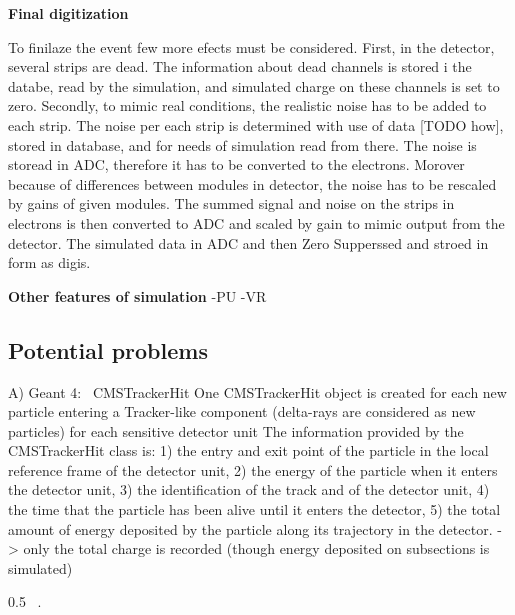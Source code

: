\textbf{Final digitization}

To finilaze the event few more efects must be considered. First, in the detector, several strips are dead. The information about dead channels is stored i  the databe, read by the simulation, and simulated charge on these channels is set to zero. Secondly, to mimic real conditions, the realistic noise has to be added to each strip. The noise per each strip is determined with use of data [TODO how], stored in database, and for needs of simulation read from there. The noise is storead in ADC, therefore it has to be converted to the electrons. Morover because of differences between modules in detector, the noise has to be rescaled by gains of given modules. The summed signal and noise on the strips in electrons is then converted to ADC and scaled by gain to mimic output from the detector. The simulated data in ADC and then Zero Supperssed and stroed in form as digis. 
 
 

\textbf{Other features of simulation}
-PU
-VR

\subsection{Potential problems}
A) Geant 4:~\cite{Lefebure:1364020}
CMSTrackerHit
One CMSTrackerHit object is created
for each new particle entering a Tracker-like component (delta-rays are considered as new particles)
for each sensitive detector unit
The information provided by the CMSTrackerHit class is:
1) the entry and exit point of the particle in the local reference frame of the detector unit,
2) the energy of the particle when it enters the detector unit,
3) the identification of the track and of the detector unit,
4) the time that the particle has been alive until it enters the detector,
5) the total amount of energy deposited by the particle along its trajectory in the detector.
-> only the total charge is recorded  (though energy deposited on subsections is simulated)

                 {0.5}       %
                 { ~\cite{website:simuBasics}. }


